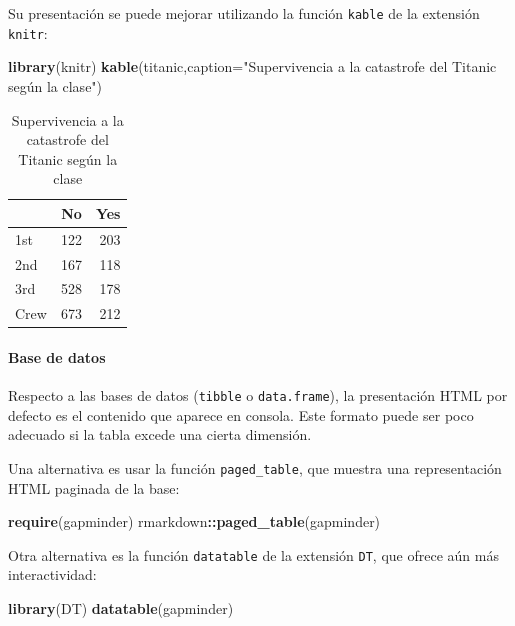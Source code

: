 \documentclass[]{article}
\newenvironment{Shaded}{\begin{snugshade}}{\end{snugshade}}
\newcommand{\DataTypeTok}[1]{\textcolor[rgb]{0.13,0.29,0.53}{#1}}
\newcommand{\KeywordTok}[1]{\textcolor[rgb]{0.13,0.29,0.53}{\textbf{#1}}}
\newcommand{\NormalTok}[1]{#1}
\newcommand{\OperatorTok}[1]{\textcolor[rgb]{0.81,0.36,0.00}{\textbf{#1}}}
\newcommand{\StringTok}[1]{\textcolor[rgb]{0.31,0.60,0.02}{#1}}
\let\oldparagraph\paragraph
\renewcommand{\paragraph}[1]{\oldparagraph{#1}\mbox{}}
\numberwithin{ejcnt}{section}
\begin{document}
Su presentación se puede mejorar utilizando la función \texttt{kable} de la extensión \texttt{knitr}:

\begin{Shaded}
\begin{Highlighting}[]
\KeywordTok{library}\NormalTok{(knitr)}
\KeywordTok{kable}\NormalTok{(titanic,}\DataTypeTok{caption=}\StringTok{"Supervivencia a la catastrofe del Titanic según la clase"}\NormalTok{)}
\end{Highlighting}
\end{Shaded}

\begin{table}[t]

\caption{\label{tab:unnamed-chunk-87}Supervivencia a la catastrofe del Titanic según la clase}
\centering
\begin{tabular}{l|r|r}
\hline
  & No & Yes\\
\hline
1st & 122 & 203\\
\hline
2nd & 167 & 118\\
\hline
3rd & 528 & 178\\
\hline
Crew & 673 & 212\\
\hline
\end{tabular}
\end{table}

\hypertarget{base-de-datos}{%
\paragraph{Base de datos}\label{base-de-datos}}

Respecto a las bases de datos (\texttt{tibble} o \texttt{data.frame}), la presentación HTML por defecto es el contenido que aparece en consola. Este formato puede ser poco adecuado si la tabla excede una cierta dimensión.

Una alternativa es usar la función \texttt{paged\_table}, que muestra una representación HTML paginada de la base:

\begin{Shaded}
\begin{Highlighting}[]
\KeywordTok{require}\NormalTok{(gapminder)}
\NormalTok{rmarkdown}\OperatorTok{::}\KeywordTok{paged_table}\NormalTok{(gapminder)}
\end{Highlighting}
\end{Shaded}

Otra alternativa es la función \texttt{datatable} de la extensión \texttt{DT}, que ofrece aún más interactividad:

\begin{Shaded}
\begin{Highlighting}[]
\KeywordTok{library}\NormalTok{(DT)}
\KeywordTok{datatable}\NormalTok{(gapminder)}
\end{Highlighting}
\end{Shaded}
\end{document}
